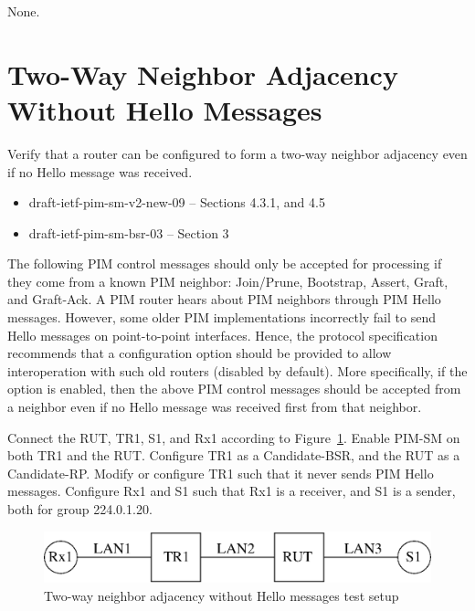 \documentclass[11pt]{report}
\begin{document}
None.

\newpage
\section{Two-Way Neighbor Adjacency Without Hello Messages}

Verify that a router can be configured to form a two-way neighbor adjacency
even if no Hello message was received.

\begin{itemize}
  \item draft-ietf-pim-sm-v2-new-09 -- Sections 4.3.1, and 4.5
  \item draft-ietf-pim-sm-bsr-03 -- Section 3
\end{itemize}

The following PIM control messages should only be accepted for processing if
they come from a known PIM neighbor: Join/Prune, Bootstrap, Assert, Graft, and
Graft-Ack. A PIM router hears about PIM neighbors
through PIM Hello messages. However, some older PIM implementations
incorrectly fail to send Hello messages on point-to-point interfaces. Hence,
the protocol specification recommends that a configuration option should be
provided to allow 
interoperation with such old routers (disabled by default). More specifically,
if the option is enabled, then the above PIM control messages should be
accepted from a neighbor even if no Hello message was received first from that
neighbor.

Connect the RUT, TR1, S1, and Rx1 according to
Figure~\ref{fig:pim_test_2_7_two_way_neighbor_adjacency_without_hello_messages}.
Enable PIM-SM on both TR1 and the RUT. Configure TR1
as a Candidate-BSR, and the RUT as a Candidate-RP. Modify or configure TR1
such that it never sends PIM Hello messages. Configure Rx1 and S1 such
that Rx1 is a receiver, and S1 is a sender, both for group 224.0.1.20.

\begin{figure}[htbp]
  \begin{center}
    \includegraphics[scale=0.8]{figs/pim_test_2_7_two_way_neighbor_adjacency_without_hello_messages}
    \caption{Two-way neighbor adjacency without Hello messages test
    setup}
    \label{fig:pim_test_2_7_two_way_neighbor_adjacency_without_hello_messages}
  \end{center}
\end{figure}
\end{document}
